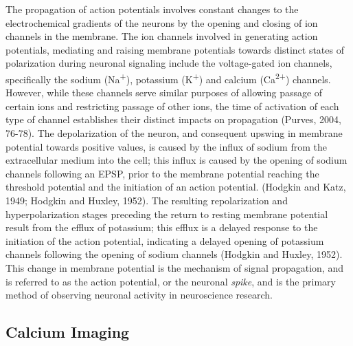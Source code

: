 \documentclass[11pt,titlepage]{article}
\begin{document}
The propagation of action potentials involves constant changes to the electrochemical gradients of the neurons by the opening and closing of ion channels in the membrane. The ion channels involved in generating action potentials, mediating and raising membrane potentials towards distinct states of polarization during neuronal signaling include the voltage-gated ion channels, specifically the sodium (Na\textsuperscript{+}), potassium (K\textsuperscript{+}) and calcium (Ca\textsuperscript{2+}) channels. However, while these channels serve similar purposes of allowing passage of certain ions and restricting passage of other ions, the time of activation of each type of channel establishes their distinct impacts on propagation (Purves, 2004, 76-78). The depolarization of the neuron, and consequent upswing in membrane potential towards positive values, is caused by the influx of sodium from the extracellular medium into the cell; this influx is caused by the opening of sodium channels following an EPSP, prior to the membrane potential reaching the threshold potential and the initiation of an action potential. (Hodgkin and Katz, 1949; Hodgkin and Huxley, 1952). The resulting repolarization and hyperpolarization stages preceding the return to resting membrane potential result from the efflux of potassium; this efflux is a delayed response to the initiation of the action potential, indicating a delayed opening of potassium channels following the opening of sodium channels (Hodgkin and Huxley, 1952). This change in membrane potential is the mechanism of signal propagation, and is referred to as the action potential, or the neuronal \textit{spike}, and is the primary method of observing neuronal activity in neuroscience research.\par

\subsection{Calcium Imaging}
\end{document}
